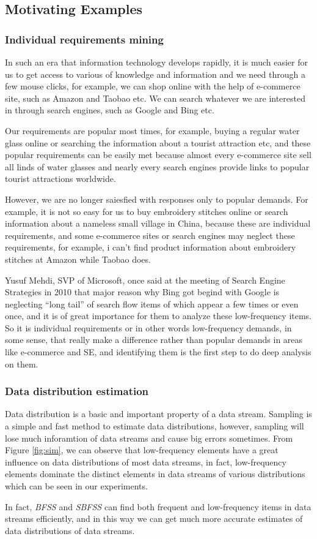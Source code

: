 \documentclass[conference]{IEEEtran}
\begin{document}
\subsection{Motivating Examples}
\subsubsection{Individual requirements mining}
In such an era that information technology develops rapidly, it is much easier for us to get access to various of knowledge and information and we need through a few mouse clicks, for example, we can shop online with the help of e-commerce site, such as Amazon and Taobao etc. We can search whatever we are interested in through search engines, such as Google and Bing etc. \par 
Our requirements are popular most times, for example, buying a regular water glass online or searching the information about a tourist attraction etc, and these popular requirements can be easily met because almost every e-commerce site sell all linds of water glasses and nearly every search engines provide links to popular tourist attractions worldwide.  \par
However, we are no longer saiesfied with responses only to popular demands. For example, it is not so easy for us to buy embroidery stitches online or search information about a nameless small village in China, because these are individual requirements, and some e-commerce sites or search engines may neglect these requirements, for example, i can't find product information about embroidery stitches at Amazon while Taobao does. \par
Yusuf Mehdi, SVP of Microsoft, once said at the meeting of Search Engine Strategies in 2010 that major reason why Bing got begind with Google is neglecting ``long tail'' of search flow items of which appear a few times or even once, and it is of great importance for them to analyze these low-frequency items. So it is individual requirements or in other words low-frequency demands, in some sense, that really make a difference rather than popular demands in areas like e-commerce and SE, and identifying them is the first step to do deep analysis on them.

\subsubsection{Data distribution estimation}
Data distribution is a basic and important property of a data stream. Sampling is a simple and fast method to estimate data distributions, however, sampling will lose much inforamtion of data streams and cause big errors sometimes. From Figure \ref{fig:sim}, we can observe that low-frequency elements have a great influence on data distributions of most data streams, in fact, low-frequency elements dominate the distinct elements in data streams of various distributions which can be seen in our experiments. \par 
In fact, \emph{BFSS} and \emph{SBFSS} can find both frequent and low-frequency items in data streams efficiently, and in this way we can get much more accurate estimates of data distributions of data streams.
\end{document}
